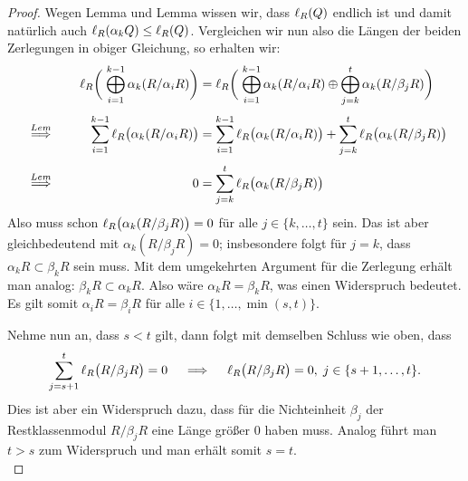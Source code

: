 \begin{proof}
    Wegen Lemma und Lemma %
    wissen wir, dass $\operatorname{\ell}_{R}(Q)$ endlich ist und damit natürlich auch
    $\operatorname{\ell}_{R}(\alpha_k Q) \leq \operatorname{\ell}_{R}(Q)$. Vergleichen wir nun also die Längen der
    beiden Zerlegungen in obiger Gleichung, so erhalten wir:
    \begin{align*}
        & &
        \len\biggl(\; \bigoplus_{i=1}^{k-1} \alpha_k (R/\alpha_i R) \biggr)
        &= \len\biggl(\; \bigoplus_{i=1}^{k-1} \alpha_k (R/\alpha_i R) \oplus
                         \bigoplus_{j=k}^{t}   \alpha_k (R/\beta_j R) \biggr)
        \\[1mm]
        &\overset{ Lem %
        }{\implies}\quad &
        \sum_{i=1}^{k-1} \len\bigl(\alpha_k (R/\alpha_i R)\bigr)
        &= \sum_{i=1}^{k-1} \len\bigl(\alpha_k (R/\alpha_i R)\bigr)
         + \sum_{j=k}^{t}   \len\bigl(\alpha_k (R/\beta_j R) \bigr)
        \\[1mm]
        &\overset{ Lem %
        }{\implies}\quad &
        0 &= \sum_{j=k}^{t} \len\bigl(\alpha_k (R/\beta_j R) \bigr)
    \end{align*}
    Also muss schon $\operatorname{\ell}_{R}\bigl(\alpha_k (R/\beta_j R) \bigr) = 0$ für alle
    $j\in\{k,\ldots,t\}$ sein. Das ist aber gleichbedeutend mit 
    $\alpha_k (R/\beta_j R) = 0$; insbesondere folgt für $j=k$, dass $\alpha_k R \subset
    \beta_k R$ sein muss. Mit dem umgekehrten Argument für die Zerlegung erhält
    man analog: $\beta_k R \subset \alpha_k R$. 
    Also wäre $\alpha_k R = \beta_k R$, was einen Widerspruch bedeutet. Es
    gilt somit $\alpha_i R = \beta_i R$ für alle $i\in\{1,\ldots,\min(s,t)\}$.
    
    Nehme nun an, dass $s<t$ gilt, dann folgt mit demselben Schluss wie oben,
    dass
    \[ \sum_{j=s+1}^{t} \operatorname{\ell}_{R}\bigl( R/\beta_j R \bigr) = 0   \quad
        \implies\quad \operatorname{\ell}_{R}\bigl(R/\beta_j R\bigr) = 0,\; j\in\{s+1,\ldots,t\} 
    . \]
    Dies ist aber ein Widerspruch dazu, dass für die Nichteinheit $\beta_j$ der
    Restklassenmodul $R/\beta_j R$ eine Länge größer $0$ haben muss.
    Analog führt man $t>s$ zum Widerspruch und man erhält somit $s=t$.
    \\
\end{proof}

